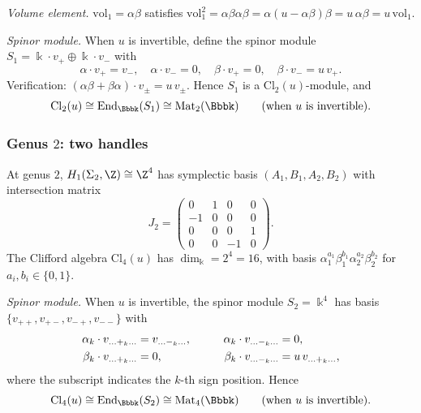 \emph{Volume element.}\;
$\mathrm{vol}_1 = \alpha\beta$ satisfies
$\mathrm{vol}_1^2 = \alpha\beta\alpha\beta =
\alpha(u - \alpha\beta)\beta = u\,\alpha\beta = u\,\mathrm{vol}_1$.

\emph{Spinor module.}\;
When $u$ is invertible, define the spinor module
$S_1 = \Bbbk \cdot v_+ \oplus \Bbbk \cdot v_-$ with
\begin{equation}\label{eq:g9-genus1-spinor}
\alpha \cdot v_+ = v_-,
\quad
\alpha \cdot v_- = 0,
\quad
\beta \cdot v_+ = 0,
\quad
\beta \cdot v_- = u\, v_+.
\end{equation}
Verification: $(\alpha\beta + \beta\alpha) \cdot v_\pm =
u\, v_\pm$. Hence $S_1$ is a $\mathrm{Cl}_2(u)$-module, and
\begin{equation}\label{eq:g9-genus1-morita}
\mathrm{Cl}_2(u) \cong \End_\Bbbk(S_1)
\cong \mathrm{Mat}_2(\Bbbk)
\qquad\text{(when $u$ is invertible).}
\end{equation}

\subsubsection{Genus $2$: two handles}
\label{subsubsec:g9-genus-2}

At genus $2$, $H_1(\Sigma_2, \Z) \cong \Z^4$ has symplectic basis
$(A_1, B_1, A_2, B_2)$ with intersection matrix
\[
J_2 = \begin{pmatrix}
0 & 1 & 0 & 0 \\
-1 & 0 & 0 & 0 \\
0 & 0 & 0 & 1 \\
0 & 0 & -1 & 0
\end{pmatrix}.
\]
The Clifford algebra $\mathrm{Cl}_4(u)$ has
$\dim_\Bbbk = 2^4 = 16$, with basis
$\alpha_1^{a_1}\beta_1^{b_1}\alpha_2^{a_2}\beta_2^{b_2}$
for $a_i, b_i \in \{0,1\}$.

\emph{Spinor module.}\;
When $u$ is invertible, the spinor module $S_2 = \Bbbk^4$ has
basis $\{v_{++}, v_{+-}, v_{-+}, v_{--}\}$ with
\begin{alignat}{2}
\alpha_k \cdot v_{\ldots+_k\ldots}
 &= v_{\ldots-_k\ldots},
&\qquad
\alpha_k \cdot v_{\ldots-_k\ldots}
 &= 0, \notag \\
\beta_k \cdot v_{\ldots+_k\ldots}
 &= 0,
&\qquad
\beta_k \cdot v_{\ldots-_k\ldots}
 &= u\, v_{\ldots+_k\ldots}, \label{eq:g9-genus2-spinor}
\end{alignat}
where the subscript indicates the $k$-th sign position. Hence
\begin{equation}\label{eq:g9-genus2-morita}
\mathrm{Cl}_4(u) \cong \End_\Bbbk(S_2)
\cong \mathrm{Mat}_4(\Bbbk)
\qquad\text{(when $u$ is invertible).}
\end{equation}

